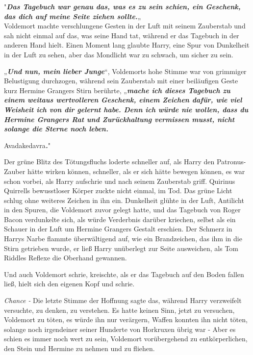 {"\textbf{\emph{Das Tagebuch war genau das, was es zu sein schien, ein Geschenk, das dich auf meine Seite ziehen sollte.}}„\\ Voldemort machte verschlungene Gesten in der Luft mit seinem Zauberstab und sah nicht einmal auf das, was seine Hand tat, während er das Tagebuch in der anderen Hand hielt. Einen Moment lang glaubte Harry, eine Spur von Dunkelheit in der Luft zu sehen, aber das Mondlicht war zu schwach, um sicher zu sein.

„\textbf{\emph{Und nun, mein lieber Junge}}“, Voldemorts hohe Stimme war von grimmiger Belustigung durchzogen, während sein Zauberstab mit einer beiläufigen Geste kurz Hermine Grangers Stirn berührte, „\textbf{\emph{mache ich dieses Tagebuch zu einem weitaus wertvolleren Geschenk, einem Zeichen dafür, wie viel Weisheit ich von dir gelernt habe. Denn ich würde nie wollen, dass du Hermine Grangers Rat und Zurückhaltung vermissen musst, nicht solange die Sterne noch leben.}}

Avadakedavra\textbf{\emph{.}}"

Der grüne Blitz des Tötungsfluchs loderte schneller auf, als Harry den Patronus-Zauber hätte wirken können, schneller, als er sich hätte bewegen können, es war schon vorbei, als Harry aufschrie und nach seinem Zauberstab griff. Quirinus Quirrells bewusstloser Körper zuckte nicht einmal, im Tod. Das grüne Licht schlug ohne weiteres Zeichen in ihn ein. Dunkelheit glühte in der Luft, Antilicht in den Spuren, die Voldemort zuvor gelegt hatte, und das Tagebuch von Roger Bacon verdunkelte sich, als würde Verderbnis darüber kriechen, selbst als ein Schauer in der Luft um Hermine Grangers Gestalt erschien. Der Schmerz in Harrys Narbe flammte überwältigend auf, wie ein Brandzeichen, das ihm in die Stirn getrieben wurde, er ließ Harry unüberlegt zur Seite ausweichen, als Tom Riddles Reflexe die Oberhand gewannen.

Und auch Voldemort schrie, kreischte, als er das Tagebuch auf den Boden fallen ließ, hielt sich den eigenen Kopf und schrie.

\emph{Chance -} Die letzte Stimme der Hoffnung sagte das, während Harry verzweifelt versuchte, zu denken, zu verstehen. Es hatte keinen Sinn, jetzt zu versuchen, Voldemort zu töten, es würde ihn nur verärgern, Waffen konnten ihn nicht töten, solange noch irgendeiner seiner Hunderte von Horkruxen übrig war - Aber es schien es immer noch wert zu sein, Voldemort vorübergehend zu entkörperlichen, den Stein und Hermine zu nehmen und zu fliehen.

}
